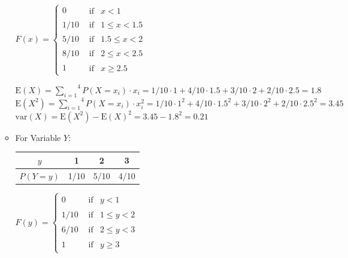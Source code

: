 \documentclass[12pt,thmsa]{article}\usepackage[]{graphicx}\usepackage[]{color}
\begin{document}
\begin{enumerate}
\begin{itemize}
			\medskip
			\begin{center}
			$F(x)=\begin{cases}
			0 & \begin{array}{cc} \textrm{if} & x<1\end{array}\\
			1/10 & \begin{array}{cc} \textrm{if} & 1\leq x<1.5\end{array}\\
			5/10 & \begin{array}{cc} \textrm{if} & 1.5\leq x<2\end{array}\\
			8/10 & \begin{array}{cc} \textrm{if} & 2\leq x<2.5\end{array}\\
			1 & \begin{array}{cc} \textrm{if} & x\geq2.5\end{array}
			\end{cases}$
			\end{center}

\begin{center}
			$\mbox{E}(X) = \overset{4}{\underset{i=1}{\sum}}P(X=x_i)\cdot x_i = 1/10\cdot1 + 4/10\cdot1.5 + 				3/10\cdot2 + 2/10\cdot2.5 = 1.8$ \\
			$\mbox{E}(X^2) = \overset{4}{\underset{i=1}{\sum}}P(X=x_i)\cdot x_i^2 = 1/10\cdot1^2 + 						4/10\cdot1.5^2 + 3/10\cdot2^2 + 2/10\cdot2.5^2 = 3.45 $\\
			$\mbox{var}(X) =  \mbox{E}(X^2) - \mbox{E}(X)^2 = 3.45 - 1.8^2 = 0.21$
\end{center}

\item 		For Variable $Y$:
			\begin{center}
			\begin{tabular}{|c|c|c|c|}
			\hline
			$y$ & 1 & 2 & 3 \\
			\hline
			$P(Y=y)$ & 1/10 & 5/10 & 4/10\\
			\hline
			\end{tabular}
			\end{center}

			\medskip
			\begin{center}
			$F(y)=\begin{cases}
			0 & \begin{array}{cc} \textrm{if} & y<1\end{array}\\
			1/10 & \begin{array}{cc} \textrm{if} & 1\leq y<2\end{array}\\
			6/10 & \begin{array}{cc} \textrm{if} & 2\leq y<3\end{array}\\
			1 & \begin{array}{cc} \textrm{if} &  y\geq 3\end{array}
			\end{cases}$
			\end{center}


\end{itemize}
\end{enumerate}
\end{document}
